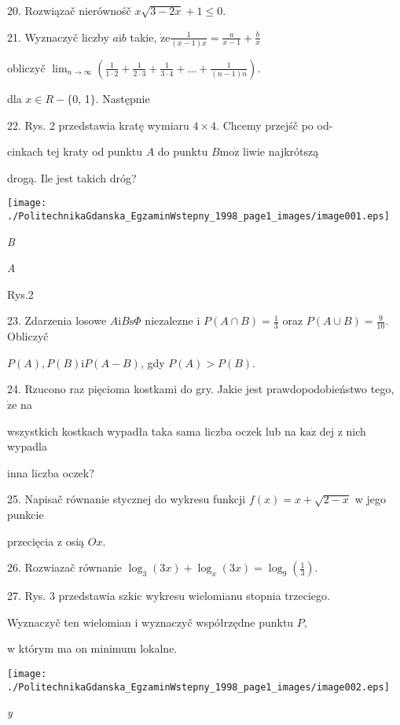 \documentclass[a4paper,12pt]{article}
\begin{document}
20. Rozwiązač nierównośč $x\sqrt{3-2x}+1\leq 0.$

21. Wyznaczyč liczby $a\mathrm{i}b$ takie, $\dot{\mathrm{z}}\mathrm{e} \displaystyle \frac{1}{(x-1)x}=\frac{a}{x-1}+\frac{b}{x}$

obliczyč $\displaystyle \lim_{n\rightarrow\infty}(\frac{1}{1\cdot 2}+\frac{1}{2\cdot 3}+\frac{1}{3\cdot 4}+\ldots+\frac{1}{(n-1)n}).$

dla $x\in R-\{0$, 1$\}$. Następnie

22. Rys. 2 przedstawia kratę wymiaru $4\times 4$. Chcemy przejśč po od-

cinkach tej kraty od punktu $A$ do punktu $B\mathrm{m}\mathrm{o}\dot{\mathrm{z}}$ liwie najkrótszą

drogą. Ile jest takich dróg?
\begin{center}
\texttt{[image: ./PolitechnikaGdanska\_EgzaminWstepny\_1998\_page1\_images/image001.eps]}
\end{center}
{\it B}

{\it A}

Rys.2

23. Zdarzenia losowe $ A\mathrm{i}B\mathrm{s}\Phi$ niezalezne i $P(A\displaystyle \cap B)=\frac{1}{3}$ oraz $P(A\displaystyle \cup B)=\frac{9}{10}$. Obliczyč

$P(A), P(B)\mathrm{i}P(A-B)$, gdy $P(A)>P(B).$

24. Rzucono raz pięcioma kostkami do gry. Jakie jest prawdopodobieństwo tego, $\dot{\mathrm{z}}\mathrm{e}$ na

wszystkich kostkach wypadła taka sama liczba oczek lub na $\mathrm{k}\mathrm{a}\dot{\mathrm{z}}$ dej z nich wypadla

inna liczba oczek?

25. Napisač równanie stycznej do wykresu funkcji $f(x) = x+\sqrt{2-x}$ w jego punkcie

przecięcia z osią $Ox.$

26. Rozwiazač równanie $\displaystyle \log_{3}(3x)+\log_{x}(3x)=\log_{9}(\frac{1}{3}).$

27. Rys. 3 przedstawia szkic wykresu wielomianu stopnia trzeciego.

Wyznaczyč ten wielomian i wyznaczyč współrzędne punktu $P,$

w którym ma on minimum lokalne.
\begin{center}
\texttt{[image: ./PolitechnikaGdanska\_EgzaminWstepny\_1998\_page1\_images/image002.eps]}
\end{center}
{\it y}
\end{document}
